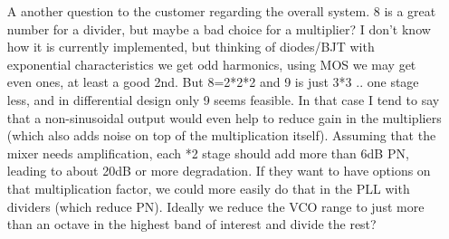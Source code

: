 






\begin{itemize}

	\item [A] another question to the customer regarding the overall system. 8 is a great number for a divider, but maybe a bad choice for a multiplier? I don't know how it is currently implemented, but thinking of diodes/BJT with exponential characteristics we get odd harmonics, using MOS we may get even ones, at least a good 2nd. But 8=2*2*2 and 9 is just 3*3 .. one stage less, and in differential design only 9 seems feasible. In that case I tend to say that a non-sinusoidal output would even help to reduce gain in the multipliers (which also adds noise on top of the multiplication itself). Assuming that the mixer needs amplification, each *2 stage should add more than 6dB PN, leading to about 20dB or more degradation. If they want to have options on that multiplication factor, we could more easily do that in the PLL with dividers (which reduce PN). Ideally we reduce the VCO range to just more than an octave in the highest band of interest and divide the rest?
 
\end{itemize}


